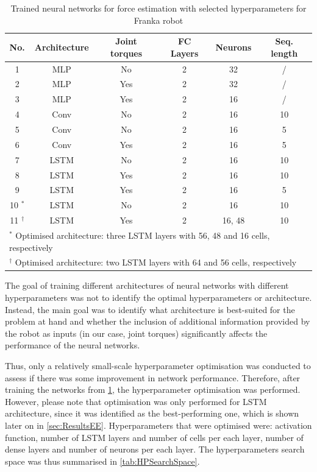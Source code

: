 \begin{table}
    \centering
    \caption{Trained neural networks for force estimation with selected hyperparameters for Franka robot}
    \label{tab:NetworksFranka}
    \begin{tabular}{cccccc}
        \toprule
        \textbf{No.} & \textbf{Architecture} & \textbf{Joint torques} & \textbf{FC Layers} & \textbf{Neurons} & \textbf{Seq. length}  \\
        \midrule
        1 & MLP & No & 2 & 32 & / \\ %
        2 & MLP & Yes & 2 & 32 & / \\ %
        3 & MLP & Yes & 2 & 16 & / \\ %
        4 & Conv & No & 2 & 16 & 10 \\ %
        5 & Conv & No & 2 & 16 & 5\\ %
        6 & Conv & Yes & 2 & 16 & 5 \\ %
        7 & LSTM & No & 2 & 16 & 10 \\ %
        8 & LSTM & Yes & 2 & 16 & 10 \\ %
        9 & LSTM & Yes & 2 & 16 & 5\\ %
        \midrule
        10 $^*$ & LSTM & No & 2 & 16 & 10\\
        11 $^\dagger$ & LSTM & Yes & 2 & 16, 48 & 10 \\
        \bottomrule
        \multicolumn{6}{l}{\footnotesize{$^*$ Optimised architecture: three LSTM layers with 56, 48 and 16 cells, respectively }}\\
        \multicolumn{6}{l}{\footnotesize{$^\dagger$ Optimised architecture: two LSTM layers with 64 and 56 cells, respectively}}
    \end{tabular}
\end{table}

The goal of training different architectures of neural networks with different hyperparameters was not to identify the optimal hyperparameters or architecture. Instead, the main goal was to identify what architecture is best-suited for the problem at hand and whether the inclusion of additional information provided by the robot as inputs (in our case, joint torques) significantly affects the performance of the neural networks.

Thus, only a relatively small-scale hyperparameter optimisation was conducted to assess if there was some improvement in network performance. Therefore, after training the networks from \cref{tab:NetworksFranka}, the hyperparameter optimisation was performed. However, please note that optimisation was only performed for LSTM architecture, since it was identified as the best-performing one, which is shown later on in \cref{sec:ResultsEE}. Hyperparameters that were optimised were: activation function, number of LSTM layers and number of cells per each layer, number of dense layers and number of neurons per each layer. The hyperparameters search space was thus summarised in \cref{tab:HPSearchSpace}.

